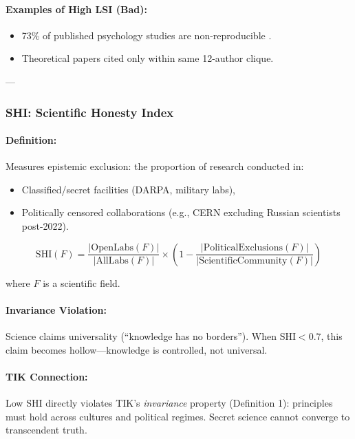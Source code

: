 \documentclass[11pt,a4paper]{article}
\theoremstyle{definition}
\theoremstyle{remark}
\begin{document}
\paragraph{Examples of High LSI (Bad):}
\begin{itemize}
\item 73\% of published psychology studies are non-reproducible \cite{osf_reproducibility}.
\item Theoretical papers cited only within same 12-author clique.
\end{itemize}

---

\subsubsection{SHI: Scientific Honesty Index}

\paragraph{Definition:}
Measures epistemic exclusion: the proportion of research conducted in:
\begin{itemize}
\item Classified/secret facilities (DARPA, military labs),
\item Politically censored collaborations (e.g., CERN excluding Russian scientists post-2022).
\end{itemize}

\[
\text{SHI}(F) = \frac{|\text{OpenLabs}(F)|}{|\text{AllLabs}(F)|} \times \left(1 - \frac{|\text{PoliticalExclusions}(F)|}{|\text{ScientificCommunity}(F)|}\right)
\]

where $F$ is a scientific field.

\paragraph{Invariance Violation:}
Science claims universality (``knowledge has no borders''). When $\text{SHI} < 0.7$, this claim becomes hollow—knowledge is controlled, not universal.

\paragraph{TIK Connection:}
Low SHI directly violates TIK's \textit{invariance} property (Definition 1): principles must hold across cultures and political regimes. Secret science cannot converge to transcendent truth.
\end{document}
